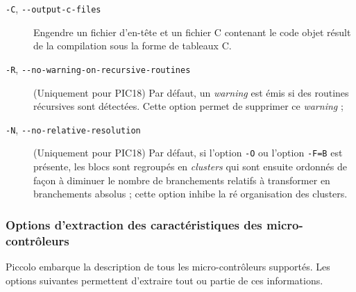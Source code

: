 \begin{description}
  \item[\texttt{-C}, \texttt{-{-}output-c-files}] Engendre un fichier d'en-tête et un fichier C contenant le code objet résult de la compilation sous la forme de tableaux C.


  \item[\texttt{-R}, \texttt{-{-}no-warning-on-recursive-routines}] (Uniquement pour PIC18) Par défaut, un \emph{warning} est émis si des routines récursives sont détectées. Cette option permet de supprimer ce \emph{warning} ;

  \item [\texttt{-N}, \texttt{-{-}no-relative-resolution}] (Uniquement pour PIC18) Par défaut, si l'option \texttt{-O} ou l'option \texttt{-F=B} est présente, les blocs sont regroupés en \emph{clusters} qui sont ensuite ordonnés de façon à diminuer le nombre de branchements relatifs à transformer en branchements absolus ; cette option inhibe la ré organisation des clusters.

\end{description}



\subsubsection{Options d'extraction des caractéristiques des micro-contrôleurs}

Piccolo embarque la description de tous les micro-contrôleurs supportés. Les options suivantes permettent d'extraire tout ou partie de ces informations.


